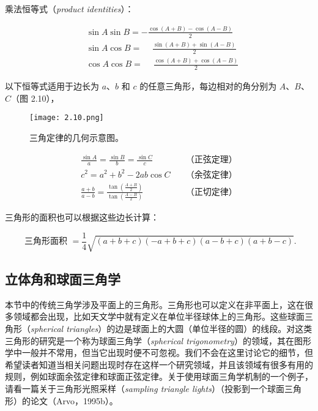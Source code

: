 \documentclass[lang=cn,12pt]{elegantbook}
\begin{document}
乘法恒等式（\textit{product identities}）：

$$
  \begin{aligned}
     & \sin A \sin B=-\frac{\cos (A+B)-\cos (A-B)}{2}           \\
     & \sin A \cos B=\phantom{-}\frac{\sin (A+B)+\sin (A-B)}{2} \\
     & \cos A \cos B=\phantom{-}\frac{\cos (A+B)+\cos (A-B)}{2}
  \end{aligned}
$$

以下恒等式适用于边长为 $a$、$b$ 和 $c$ 的任意三角形，每边相对的角分别为 $A$、$B$、$C$（图 2.10），

\begin{figure}[htbp]
  \centering
  \texttt{[image: 2.10.png]}
  \caption{三角定律的几何示意图。}
\end{figure}

$$
  \begin{aligned}
    \frac{\sin A}{a}=\frac{\sin B}{b}=\frac{\sin C}{c}\quad                                      & \mbox{（正弦定理）} \\
    c^{2}=a^{2}+b^{2}-2 a b \cos C\quad                                                          & \mbox{（余弦定律）} \\
    \frac{a+b}{a-b}=\frac{\tan \left(\frac{A+B}{2}\right)}{\tan \left(\frac{A-B}{2}\right)}\quad & \mbox{（正切定律）}
  \end{aligned}
$$

三角形的面积也可以根据这些边长计算：

$$
  \text { 三角形面积 }=\frac{1}{4} \sqrt{(a+b+c)(-a+b+c)(a-b+c)(a+b-c)} .
$$

\subsection{立体角和球面三角学}

本节中的传统三角学涉及平面上的三角形。三角形也可以定义在非平面上，这在很多领域都会出现，比如天文学中就有定义在单位半径球体上的三角形。这些球面三角形（\textit{spherical triangles}）的边是球面上的大圆（单位半径的圆）的线段。对这类三角形的研究是一个称为球面三角学（\textit{spherical trigonometry}）的领域，其在图形学中一般并不常用，但当它出现时便不可忽视。我们不会在这里讨论它的细节，但希望读者知道当相关问题出现时存在这样一个研究领域，并且该领域有很多有用的规则，例如球面余弦定律和球面正弦定律。关于使用球面三角学机制的一个例子，请看一篇关于三角形光照采样（\textit{sampling triangle lights}）（投影到一个球面三角形）的论文（Arvo，1995b）。
\end{document}

